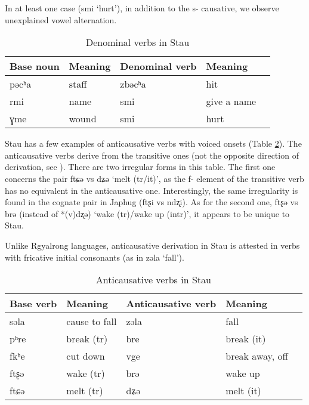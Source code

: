 \documentclass[oneside,a4paper,11pt]{article}
\newcommand{\ipa}[1]{{\phon#1}} %
\begin{document}
In at least one case (\ipa{smi} `hurt'), in addition to the \ipa{s-} causative, we observe unexplained vowel alternation. 
 
 \begin{table}[H]
 \caption{Denominal verbs in Stau} \label{tab:denominal} \centering 
\begin{tabular}{lllll}
\toprule
Base noun & Meaning & Denominal verb & Meaning \\
\midrule
\ipa{pəcʰa} & staff&\ipa{zbəcʰa} & hit \\
\ipa{rmi} &name &\ipa{smi} &give a name \\
\ipa{ɣme} &wound &\ipa{smi} & hurt \\
\bottomrule
\end{tabular}
\end{table}
 
 
 Stau has a few examples of anticausative verbs with voiced onsets (Table \ref{tab:anticausative}). The anticausative verbs derive from the transitive ones (not the opposite direction of derivation, see \citealt{jacques12demotion}). There are two irregular forms in this table. The first one concerns the pair \ipa{ftɕə} vs \ipa{dʑə} `melt (tr/it)', as the \ipa{f-} element of the transitive verb has no equivalent in the anticausative one. Interestingly, the same irregularity is found in the cognate pair in Japhug (\ipa{ftʂi} vs \ipa{ndʐi}). As for the second one, \ipa{ftʂə} vs \ipa{brə} (instead of *\ipa{(v)dʐə}) `wake (tr)/wake up (intr)', it appears to be unique to Stau.
 
Unlike Rgyalrong languages, anticausative derivation in Stau is attested in verbs with fricative initial consonants (as in \ipa{zəla}  `fall').
 
  \begin{table}[H]
 \caption{Anticausative verbs in Stau} \label{tab:anticausative} \centering 
\begin{tabular}{lllll}
\toprule
Base verb & Meaning & Anticausative verb & Meaning \\
\midrule
 \ipa{səla} &cause to fall & \ipa{zəla}  & fall \\
\ipa{pʰre}   &break (tr) &\ipa{bre}   & break (it) \\
  \ipa{fkʰe} & cut down & \ipa{vge} & break away, off \\
\ipa{ftʂə}& wake (tr) & \ipa{brə}& wake up\\
\ipa{ftɕə} &melt (tr) &\ipa{dʑə} &melt (it)\\
 \bottomrule
\end{tabular}
\end{table}
 
\end{document}
